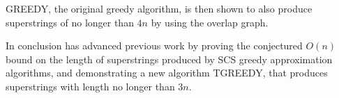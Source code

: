 \documentclass[letterpaper,11pt,titlepage]{article}
\begin{document}
GREEDY, the original greedy algorithm, is then shown to also produce superstrings of no longer than $4n$ by using the overlap graph.

In conclusion \cite{blum1991linear} has advanced previous work by proving the conjectured $O(n)$ bound on the length of superstrings produced by SCS greedy approximation algorithms, and demonstrating a new algorithm TGREEDY, that produces superstrings with length no longer than $3n$.

\newpage
{
  \small 
  
  
}
\end{document}

